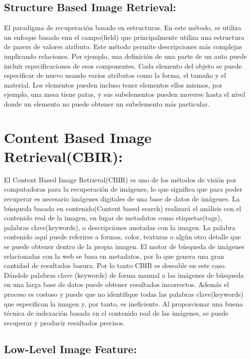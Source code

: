 \documentclass{llncs}
\begin{document}
\subsection{Structure Based Image Retrieval:}

El paradigma de recuperaci\'on basado en estructuras. En este m\'etodo, se utiliza un enfoque basado enn el campo(field) que principalmente
utiliza una estructura de parers de valores atributo. Este m\'etodo permite descripciones m\'as complejas implicando relaciones. Por ejemplo,
una definici\'on de una parte de un auto puede incluir especificaciones de esos componentes. Cada elemento del objeto se puede especificar 
de nuevo usando varios atributos como la forma, el tama\~{n}o y el material. Los elementos pueden incluso tener elementos ellos mismos, por 
ejemplo, una mesa tiene patas, y sus subelementos pueden moverse hasta el nivel donde un elemento no puede obtener un subelemento m\'as particular.

\section{Content Based Image Retrieval(CBIR):}

El Content Based Image Retrieval(CBIR) es uno de los m\'etodos de visi\'on por computadoras para la recuperaci\'on de
im\'agenes, lo que significa que para poder recuperar es necesario im\'agenes digitales de una base de datos de im\'agenes. 
La b\'usqueda basada en contenido(Content based search) realizar\'a el an\'alisis con el contenido real de la imagen, en 
lugar de metadatos como etiquetas(tags), palabras clave(keywords), o descripciones anotadas con la imagen. La palabra 
contenido aqu\'i puede referirse a formas, color, texturas o alg\'un otro detalle que se puede obtener dentro de la propia
imagen. El motor de búsqueda de imágenes relacionadas con la web se basa en metadatos, por lo que genera una gran cantidad 
de resultados basura. Por lo tanto CBIR es deseable en este caso. D\'andole palabras clave (keywords) de forma manual a las 
im\'agenes de b\'usqueda en una larga base de datos puede obtener resultados incorrectos. Adem\'as el proceso es costoso y 
puede que no identifique todas las palabras clave(keywords) que especifican la imagen y, por tanto, es ineficiente. Al 
proporcionar una buena técnica de indexación basada en el contenido real de las imágenes, se puede recuperar y producir
resultados precisos.

\subsection{Low-Level Image Feature:}
\end{document}
